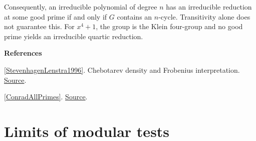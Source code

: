 \documentclass[11pt,a4paper,oneside,openany]{book}
\newenvironment{sources}{\par\smallskip\begingroup\footnotesize\color{atlasgray}\leftskip=10pt\setlength{\parskip}{2pt}}{\par\endgroup\smallskip}
\begin{document}
\color{black} Consequently, an irreducible polynomial of degree \(n\) has an irreducible reduction at some good prime if and only if \(G\) contains an \(n\)-cycle. Transitivity alone does not guarantee this. For \(x^4+1\), the group is the Klein four-group and no good prime yields an irreducible quartic reduction.\par
\begin{sources}
\textbf{References}\par\smallskip
\noindent\hyperlink{ref:StevenhagenLenstra1996}{[StevenhagenLenstra1996]}. Chebotarev density and Frobenius interpretation. \href{https://pub.math.leidenuniv.nl/~lenstrahw/PUBLICATIONS/1996d/art.pdf}{Source}.\par
\noindent\hyperlink{ref:ConradAllPrimes}{[ConradAllPrimes]}.  \href{https://kconrad.math.uconn.edu/blurbs/ringtheory/reducibleallp.pdf}{Source}.\par
\end{sources}\color{black}
\section{Limits of modular tests}
\end{document}

